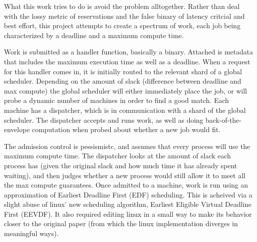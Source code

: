 What this work tries to do is avoid the problem alltogether. Rather than deal
with the lossy metric of reservations and the false binary of latency critcial
and best effort, this project attempts to create a spectrum of work, each job
being characterized by a deadline and a maximum compute time.

Work is submitted as a handler function, basically a binary. Attached is
metadata that includes the maximum execution time as well as a deadline. When a
request for this handler comes in, it is initially routed to the relevant shard
of a global scheduler. Depending on the amount of slack (difference between
deadline and max compute) the global scheduler will either immediately place the
job, or will probe a dynamic number of machines in order to find a good match.
Each machine has a dispatcher, which is in communication with a shard of the
global scheduler. The dispatcher accepts and runs work, as well as doing
back-of-the-envelope computation when probed about whether a new job would fit. 

The admission control is pessismistc, and assumes that every process will use
the maximum compute time. The dispatcher looks at the amount of slack each
process has (given the original slack and how much time it has already spent
waiting), and then judges whether a new process would still allow it to meet all
the max compute guarantees. Once admitted to a machine, work is run using an
approximation of Earliest Deadline First (EDF) scheduling. This is acheived via a
slight abuse of linux' new scheduling algorithm, Earliest Eligible Virtual
Deadline First (EEVDF). It also required editing linux in a small way to make
its behavior closer to the original paper (from which the linux implementation
diverges in meaningful ways).

